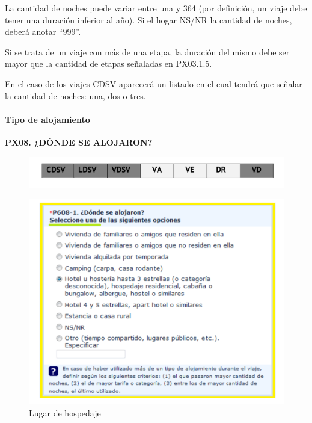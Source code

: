 \documentclass[
  openany]{book}
\begin{document}
La cantidad de noches puede variar entre una y 364 (por definición, un viaje debe tener una duración inferior al año). Si el hogar NS/NR la cantidad de noches, deberá anotar ``999''.

Si se trata de un viaje con más de una etapa, la duración del mismo debe ser mayor que la cantidad de etapas señaladas en PX03.1.5.

En el caso de los viajes CDSV aparecerá un listado en el cual tendrá que señalar la cantidad de noches: una, dos o tres.

\hypertarget{tipo-de-alojamiento}{%
\paragraph{Tipo de alojamiento}\label{tipo-de-alojamiento}}

\textbf{PX08. ¿DÓNDE SE ALOJARON?}

\begin{figure}

{\centering \includegraphics[width=1\linewidth]{imagenes/figura6-96} 

}

\end{figure}

\begin{figure}

{\centering \includegraphics[width=1\linewidth]{imagenes/figura6-97} 

}

\caption{Lugar de hospedaje}\label{fig:lugar3}
\end{figure}
\end{document}
